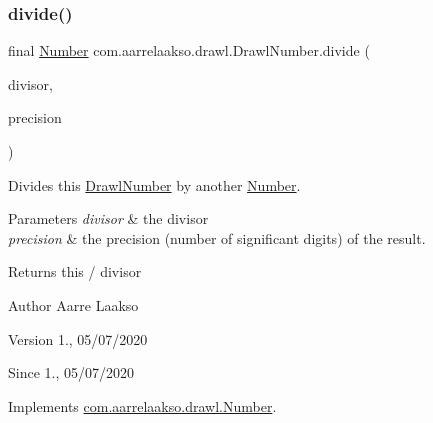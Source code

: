 \subsubsection{\texorpdfstring{divide()}{divide()}\hspace{0.1cm}{\footnotesize\ttfamily [2/3]}}
{\footnotesize\ttfamily final \hyperlink{interfacecom_1_1aarrelaakso_1_1drawl_1_1_number}{Number} com.\+aarrelaakso.\+drawl.\+Drawl\+Number.\+divide (\begin{DoxyParamCaption}\item[{@Not\+Null final \hyperlink{interfacecom_1_1aarrelaakso_1_1drawl_1_1_number}{Number}}]{divisor,  }\item[{final int}]{precision }\end{DoxyParamCaption})}



Divides this \hyperlink{classcom_1_1aarrelaakso_1_1drawl_1_1_drawl_number}{Drawl\+Number} by another \hyperlink{interfacecom_1_1aarrelaakso_1_1drawl_1_1_number}{Number}. 


\begin{DoxyParams}{Parameters}
{\em divisor} & the divisor \\
\hline
{\em precision} & the precision (number of significant digits) of the result. \\
\hline
\end{DoxyParams}
\begin{DoxyReturn}{Returns}
this / divisor 
\end{DoxyReturn}
\begin{DoxyAuthor}{Author}
Aarre Laakso 
\end{DoxyAuthor}
\begin{DoxyVersion}{Version}
1., 05/07/2020 
\end{DoxyVersion}
\begin{DoxySince}{Since}
1., 05/07/2020 
\end{DoxySince}


Implements \hyperlink{interfacecom_1_1aarrelaakso_1_1drawl_1_1_number_acfcd993a82faa41956430086986084e7}{com.\+aarrelaakso.\+drawl.\+Number}.

\mbox{\label{classcom_1_1aarrelaakso_1_1drawl_1_1_drawl_number_a4ba0f1728e95fe494d440c04228041f7}} 
